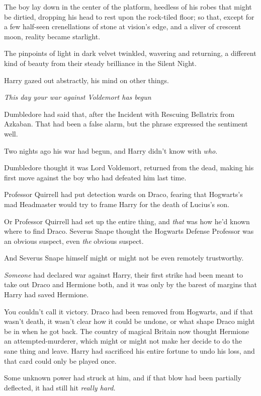 The boy lay down in the center of the platform, heedless of his robes that
might be dirtied, dropping his head to rest upon the rock-tiled floor; so that,
except for a few half-seen crenellations of stone at vision's edge, and a
sliver of crescent moon, reality became starlight.

The pinpoints of light in dark velvet twinkled, wavering and returning, a
different kind of beauty from their steady brilliance in the Silent Night.

Harry gazed out abstractly, his mind on other things.

\emph{This day your war against Voldemort has begun{\el}}

Dumbledore had said that, after the Incident with Rescuing Bellatrix from
Azkaban. That had been a false alarm, but the phrase expressed the sentiment
well.

Two nights ago his war had begun, and Harry didn't know with \emph{who}.

Dumbledore thought it was Lord Voldemort, returned from the dead, making his
first move against the boy who had defeated him last time.

Professor Quirrell had put detection wards on Draco, fearing that Hogwarts's
mad Headmaster would try to frame Harry for the death of Lucius's son.

Or Professor Quirrell had set up the entire thing, and \emph{that} was how he'd
known where to find Draco. Severus Snape thought the Hogwarts Defense Professor
was an obvious suspect, even \emph{the} obvious suspect.

And Severus Snape himself might or might not be even remotely trustworthy.

\emph{Someone} had declared war against Harry, their first strike had been
meant to take out Draco and Hermione both, and it was only by the barest of
margins that Harry had saved Hermione.

You couldn't call it victory. Draco had been removed from Hogwarts, and if that
wasn't death, it wasn't clear how it could be undone, or what shape Draco might
be in when he got back. The country of magical Britain now thought Hermione an
attempted-murderer, which might or might not make her decide to do the sane
thing and leave. Harry had sacrificed his entire fortune to undo his loss, and
that card could only be played once.

Some unknown power had struck at him, and if that blow had been partially
deflected, it had still hit \emph{really hard.}

